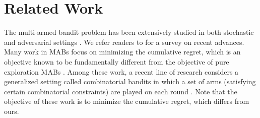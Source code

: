 \documentclass{article}
\newcommand{\Algorithm}{{\small \textsf{CLUCB}}\xspace}
\newcommand{\AlgorithmBud}{{\small \textsf{CSAR}}\xspace}
\newcommand{\Problem}{{CPE}\xspace}
\newcommand{\M}{\mathcal M}
\DeclareMathOperator{\rank}{width}
\begin{document}
\vspace{-1em}
\section{Related Work}
\vspace{-1em}
The multi-armed bandit problem has been extensively studied in both stochastic and adversarial settings \citep{lai1985asymptotically,auer2002nonstochastic,auer2002finite}.
We refer readers to \citep{bubeck2012regret} for a survey on recent advances.
Many work in MABs focus on minimizing the cumulative regret, which is an objective known to be fundamentally different from the objective of pure exploration MABs \citep{bubeck2010pure}.
Among these work, a recent line of research considers a generalized setting called combinatorial bandits in which a set of arms (satisfying certain combinatorial constraints) are played on each round \citep{cesa2012combinatorial,audibert2009minimax,kale2010non,neu2010online,Bubeck12towardsminimax,chen2013combinatorial,gopalan2014thompson,lin2014,kveton2014matroid}.
Note that the objective of these work is to minimize the cumulative regret, which differs from ours.
\end{document}

